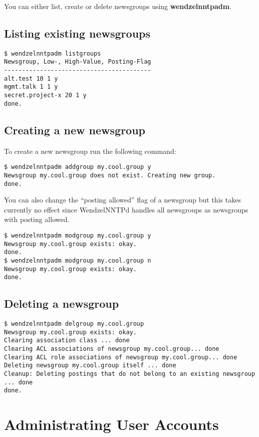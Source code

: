 You can either list, create or delete newsgroups using {\bf wendzelnntpadm}.

\subsection{Listing existing newsgroups}

\begin{verbatim}
$ wendzelnntpadm listgroups
Newsgroup, Low-, High-Value, Posting-Flag
-----------------------------------------
alt.test 10 1 y
mgmt.talk 1 1 y
secret.project-x 20 1 y
done.
\end{verbatim}

\subsection{Creating a new newsgroup}

To create a new newsgroup run the following command:

\begin{verbatim}
$ wendzelnntpadm addgroup my.cool.group y
Newsgroup my.cool.group does not exist. Creating new group.
done.
\end{verbatim}

You can also change the ``posting allowed'' flag of a newsgroup but this takes currently no effect since WendzelNNTPd handles all newsgroups as newsgroups with posting allowed.

\begin{verbatim}
$ wendzelnntpadm modgroup my.cool.group y
Newsgroup my.cool.group exists: okay.
done.
$ wendzelnntpadm modgroup my.cool.group n
Newsgroup my.cool.group exists: okay.
done.
\end{verbatim}

\subsection{Deleting a newsgroup}

\begin{verbatim}
$ wendzelnntpadm delgroup my.cool.group
Newsgroup my.cool.group exists: okay.
Clearing association class ... done
Clearing ACL associations of newsgroup my.cool.group... done
Clearing ACL role associations of newsgroup my.cool.group... done
Deleting newsgroup my.cool.group itself ... done
Cleanup: Deleting postings that do not belong to an existing newsgroup ... done
done.
\end{verbatim}

\section{Administrating User Accounts}


